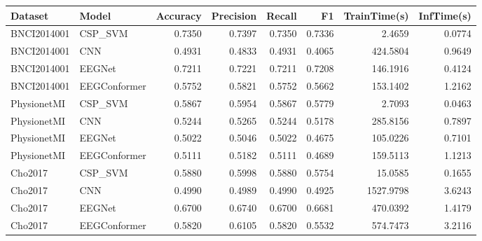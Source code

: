 \begin{tabular}{llrrrrrr}
\toprule
Dataset & Model & Accuracy & Precision & Recall & F1 & TrainTime(s) & InfTime(s) \\
\midrule
BNCI2014001 & CSP_SVM & 0.7350 & 0.7397 & 0.7350 & 0.7336 & 2.4659 & 0.0774 \\
BNCI2014001 & CNN & 0.4931 & 0.4833 & 0.4931 & 0.4065 & 424.5804 & 0.9649 \\
BNCI2014001 & EEGNet & 0.7211 & 0.7221 & 0.7211 & 0.7208 & 146.1916 & 0.4124 \\
BNCI2014001 & EEGConformer & 0.5752 & 0.5821 & 0.5752 & 0.5662 & 153.1402 & 1.2162 \\
PhysionetMI & CSP_SVM & 0.5867 & 0.5954 & 0.5867 & 0.5779 & 2.7093 & 0.0463 \\
PhysionetMI & CNN & 0.5244 & 0.5265 & 0.5244 & 0.5178 & 285.8156 & 0.7897 \\
PhysionetMI & EEGNet & 0.5022 & 0.5046 & 0.5022 & 0.4675 & 105.0226 & 0.7101 \\
PhysionetMI & EEGConformer & 0.5111 & 0.5182 & 0.5111 & 0.4689 & 159.5113 & 1.1213 \\
Cho2017 & CSP_SVM & 0.5880 & 0.5998 & 0.5880 & 0.5754 & 15.0585 & 0.1655 \\
Cho2017 & CNN & 0.4990 & 0.4989 & 0.4990 & 0.4925 & 1527.9798 & 3.6243 \\
Cho2017 & EEGNet & 0.6700 & 0.6740 & 0.6700 & 0.6681 & 470.0392 & 1.4179 \\
Cho2017 & EEGConformer & 0.5820 & 0.6105 & 0.5820 & 0.5532 & 574.7473 & 3.2116 \\
\bottomrule
\end{tabular}

